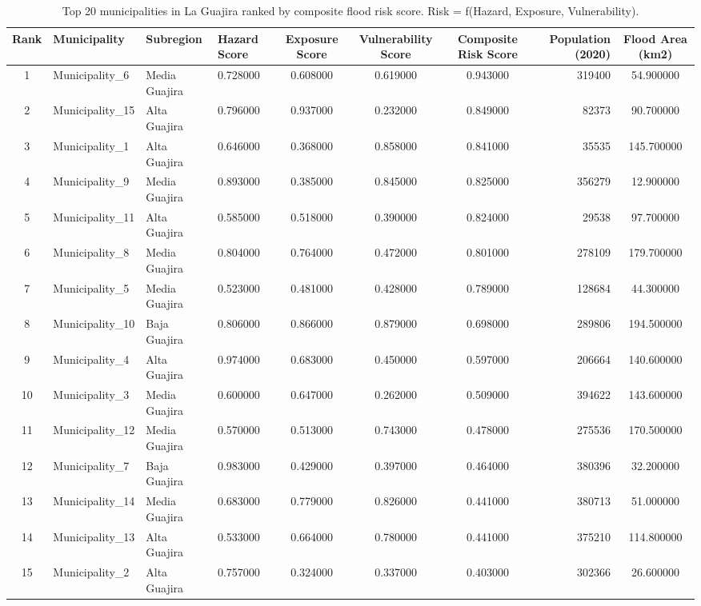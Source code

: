 \begin{table}[htbp]
\caption{Top 20 municipalities in La Guajira ranked by composite flood risk score. Risk = f(Hazard, Exposure, Vulnerability).}
\label{tab:municipal_risk}
\begin{tabular}{clllcccrc}
\toprule
Rank & Municipality & Subregion & Hazard Score & Exposure Score & Vulnerability Score & Composite Risk Score & Population (2020) & Flood Area (km2) \\
\midrule
1 & Municipality\_6 & Media Guajira & 0.728000 & 0.608000 & 0.619000 & 0.943000 & 319400 & 54.900000 \\
2 & Municipality\_15 & Alta Guajira & 0.796000 & 0.937000 & 0.232000 & 0.849000 & 82373 & 90.700000 \\
3 & Municipality\_1 & Alta Guajira & 0.646000 & 0.368000 & 0.858000 & 0.841000 & 35535 & 145.700000 \\
4 & Municipality\_9 & Media Guajira & 0.893000 & 0.385000 & 0.845000 & 0.825000 & 356279 & 12.900000 \\
5 & Municipality\_11 & Alta Guajira & 0.585000 & 0.518000 & 0.390000 & 0.824000 & 29538 & 97.700000 \\
6 & Municipality\_8 & Media Guajira & 0.804000 & 0.764000 & 0.472000 & 0.801000 & 278109 & 179.700000 \\
7 & Municipality\_5 & Media Guajira & 0.523000 & 0.481000 & 0.428000 & 0.789000 & 128684 & 44.300000 \\
8 & Municipality\_10 & Baja Guajira & 0.806000 & 0.866000 & 0.879000 & 0.698000 & 289806 & 194.500000 \\
9 & Municipality\_4 & Alta Guajira & 0.974000 & 0.683000 & 0.450000 & 0.597000 & 206664 & 140.600000 \\
10 & Municipality\_3 & Media Guajira & 0.600000 & 0.647000 & 0.262000 & 0.509000 & 394622 & 143.600000 \\
11 & Municipality\_12 & Media Guajira & 0.570000 & 0.513000 & 0.743000 & 0.478000 & 275536 & 170.500000 \\
12 & Municipality\_7 & Baja Guajira & 0.983000 & 0.429000 & 0.397000 & 0.464000 & 380396 & 32.200000 \\
13 & Municipality\_14 & Media Guajira & 0.683000 & 0.779000 & 0.826000 & 0.441000 & 380713 & 51.000000 \\
14 & Municipality\_13 & Alta Guajira & 0.533000 & 0.664000 & 0.780000 & 0.441000 & 375210 & 114.800000 \\
15 & Municipality\_2 & Alta Guajira & 0.757000 & 0.324000 & 0.337000 & 0.403000 & 302366 & 26.600000 \\
\bottomrule
\end{tabular}
\end{table}
